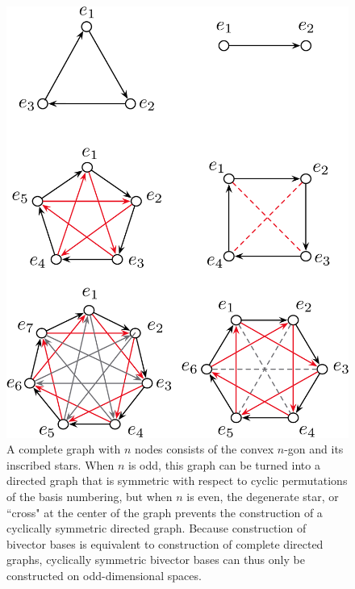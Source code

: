 \documentclass[11pt]{article}
\newtheorem{theorem}{Theorem}[section]
\begin{document}
\begin{figure}[tbp]
\begin{center}
\includegraphics[width=.75\textwidth]{CyclicSymmetricGraphs.pdf}
\caption{A complete graph with $n$ nodes consists of the convex $n$-gon and its inscribed stars. When $n$ is odd, this graph can be turned into a directed graph that is symmetric with respect to cyclic permutations of the basis numbering, but when $n$ is even, the degenerate star, or ``cross" at the center of the graph prevents the construction of a cyclically symmetric directed graph. Because construction of bivector bases is equivalent to construction of complete directed graphs, cyclically symmetric bivector bases can thus only be constructed on odd-dimensional spaces.}
\label{fig:polygonandstars}
\end{center}
\end{figure}



\end{document}
